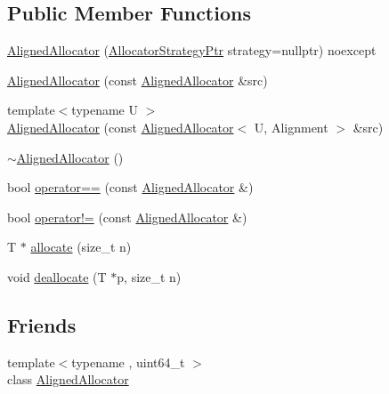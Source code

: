 \subsection*{Public Member Functions}
\begin{DoxyCompactItemize}
\item 
\hyperlink{classhetest_1_1utils_1_1AlignedAllocator_af66cd2d6a02b27e18ba02ffc3a345544}{Aligned\-Allocator} (\hyperlink{namespacehetest_1_1utils_a3f7f347b9f62a88014bdcc45f7987846}{Allocator\-Strategy\-Ptr} strategy=nullptr) noexcept
\item 
\hyperlink{classhetest_1_1utils_1_1AlignedAllocator_a71bdbfb1ae4ac672c4a0dc4e7504e195}{Aligned\-Allocator} (const \hyperlink{classhetest_1_1utils_1_1AlignedAllocator}{Aligned\-Allocator} \&src)
\item 
{\footnotesize template$<$typename U $>$ }\\\hyperlink{classhetest_1_1utils_1_1AlignedAllocator_a3a1080fe5c9e4be3d73da338835c9fa7}{Aligned\-Allocator} (const \hyperlink{classhetest_1_1utils_1_1AlignedAllocator}{Aligned\-Allocator}$<$ U, Alignment $>$ \&src)
\item 
\hyperlink{classhetest_1_1utils_1_1AlignedAllocator_a0d84644228d98daf2407ff6046ceca5a}{$\sim$\-Aligned\-Allocator} ()
\item 
bool \hyperlink{classhetest_1_1utils_1_1AlignedAllocator_a9e7374df3ec465f1b2e522f5e7c57ee0}{operator==} (const \hyperlink{classhetest_1_1utils_1_1AlignedAllocator}{Aligned\-Allocator} \&)
\item 
bool \hyperlink{classhetest_1_1utils_1_1AlignedAllocator_ab17ae365e2e63a0b1c27c5b194b0dbf1}{operator!=} (const \hyperlink{classhetest_1_1utils_1_1AlignedAllocator}{Aligned\-Allocator} \&)
\item 
T $\ast$ \hyperlink{classhetest_1_1utils_1_1AlignedAllocator_a3d9f851ef4ffdbd83936f1810e53752d}{allocate} (size\-\_\-t n)
\item 
void \hyperlink{classhetest_1_1utils_1_1AlignedAllocator_a109a8cc9e6c49b75382f9c019b04ba03}{deallocate} (T $\ast$p, size\-\_\-t n)
\end{DoxyCompactItemize}
\subsection*{Friends}
\begin{DoxyCompactItemize}
\item 
{\footnotesize template$<$typename , uint64\-\_\-t $>$ }\\class \hyperlink{classhetest_1_1utils_1_1AlignedAllocator_aaded07599020ca35e89e078674263c63}{Aligned\-Allocator}
\end{DoxyCompactItemize}


